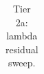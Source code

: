 \begin{table}[htbp]
\centering
\caption{Tier 2a: lambda residual sweep.}
\label{tab:tier2a_lambda}
\begin{tabular}{l}
\toprule
 \\
\midrule
\bottomrule
\end{tabular}
\end{table}
